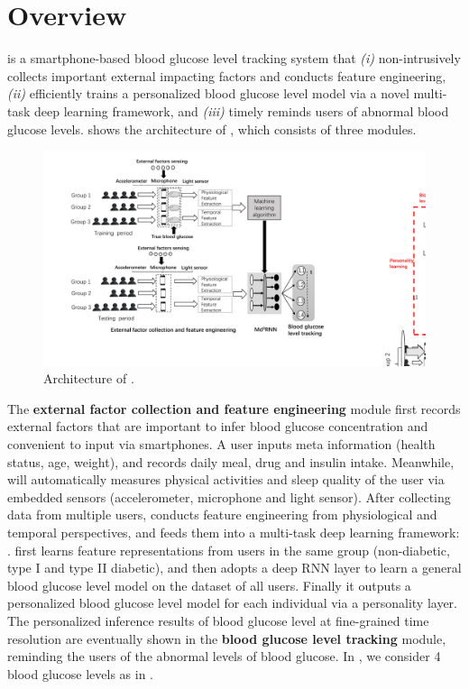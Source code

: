 
\section{Overview}
\label{sec:overview}
\sysname is a smartphone-based blood glucose level tracking system that \emph{(i)} non-intrusively collects important external impacting factors and conducts feature engineering, \emph{(ii)} efficiently trains a personalized blood glucose level model via a novel multi-task deep learning framework, and \emph{(iii)} timely reminds users of abnormal blood glucose levels.
 shows the architecture of \sysname, which consists of three modules.

\begin{figure}[h]
  \centering
  \includegraphics[width=0.85\columnwidth]{./img/System_Arch2.pdf}
  \caption{Architecture of \sysname.}
  \label{fig:architecture}
\end{figure}

The \textbf{external factor collection and feature engineering} module first records external factors that are important to infer blood glucose concentration and convenient to input via smartphones.
A user inputs meta information (\eg health status, age, weight), and records daily meal, drug and insulin intake.
Meanwhile, \sysname will automatically measures physical activities and sleep quality of the user via embedded sensors (\ie accelerometer, microphone and light sensor). After collecting data from multiple users, \sysname conducts feature engineering from physiological and temporal perspectives, and feeds them into a multi-task deep learning framework: \textbf{\modelname}.
\modelname first learns feature representations from users in the same group (non-diabetic, type I and type II diabetic), and then adopts a deep RNN layer to learn a general blood glucose level model on the dataset of all users.
Finally it outputs a personalized blood glucose level model for each individual via a personality layer. The personalized inference results of blood glucose level at fine-grained time resolution are eventually shown in the \textbf{blood glucose level tracking} module, reminding the users of the abnormal levels of blood glucose.
In \sysname, we consider 4 blood glucose levels as in .

